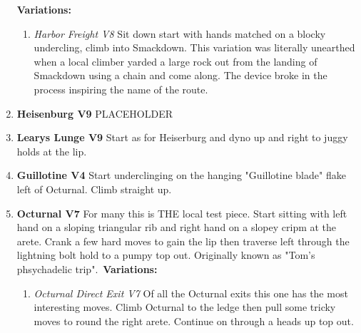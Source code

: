 \begin{multicols*}{2}
\begin{enumerate}[]
					\newline \textbf{Variations:}
					\begin{enumerate}
						\item\label{vr:Harbor Freight} \colorbox{Goldenrod!50}{\emph{Harbor Freight V8 \ding{72} \ding{72}   }  }
						\newline Sit down start with hands matched on a blocky undercling, climb into Smackdown. This variation was literally unearthed when a local climber yarded a large rock out from the landing of Smackdown using a chain and come along. The device broke in the process inspiring the name of the route.\
					\end{enumerate}
					\setcounter{enumi}{5}
					\item\label{rt:Heisenburg} \colorbox{Goldenrod!50}{\textbf{Heisenburg V9  } }
					\newline PLACEHOLDER\
					\setcounter{enumi}{6}
					\item\label{rt:Learys Lunge} \colorbox{Goldenrod!50}{\textbf{Learys Lunge V9     } }
					\newline Start as for Heiserburg and dyno up and right to juggy holds at the lip.\
					\setcounter{enumi}{7}
					\item\label{rt:Guillotine} \colorbox{RoyalBlue!20}{\textbf{Guillotine V4    } }
					\newline Start underclinging on the hanging "Guillotine blade" flake left of Octurnal. Climb straight up.\
					\setcounter{enumi}{8}
					\item\label{rt:Octurnal} \colorbox{Goldenrod!50}{\textbf{Octurnal V7     } }
					\newline For many this is THE local test piece. Start sitting with left hand on a sloping triangular rib and right hand on a slopey cripm at the arete. Crank a few hard moves to gain the lip then traverse left through the lightning bolt hold to a pumpy top out. Originally known as "Tom's phsychadelic trip".\
					\newline \textbf{Variations:}
					\begin{enumerate}
						\item\label{vr:Octurnal Direct Exit} \colorbox{Goldenrod!50}{\emph{Octurnal Direct Exit V7     }  }
						\newline Of all the Octurnal exits this one has the most interesting moves. Climb Octurnal to the ledge then pull some tricky moves to round the right arete. Continue on through a heads up top out.\

\end{enumerate}
\end{enumerate}
\end{multicols*}
